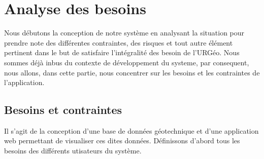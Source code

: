 \chapter{Analyse des besoins}
        Nous débutons la conception de notre système en analysant la
        situation pour prendre note des différentes contraintes, des risques
        et tout autre élément pertinent dans le but de satisfaire l'intégralité
        des besoin de l'URGéo.  Nous sommes déjà inbus du contexte de développement
        du systeme, par consequent, nous allons, dans cette partie, nous concentrer
        sur les besoins et les contraintes de l'application.
        \section{Besoins et contraintes}
                Il s'agit de la conception d'une base de données géotechnique et d'une
                application web permettant de visualiser ces dites données. Définissons
                d'abord tous les besoins des différents utisateurs du système.
